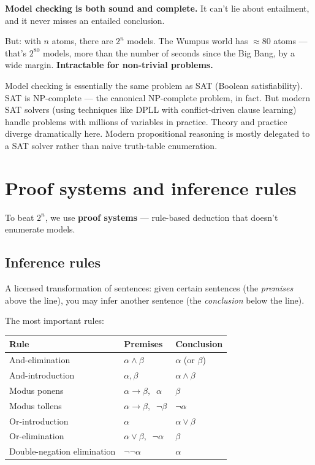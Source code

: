 \documentclass[11pt, a4paper]{article}
\newcommand{\thead}[1]{\textbf{#1}}
\begin{document}
\textbf{Model checking is both sound and complete.} It can't lie about entailment, and it never misses an entailed conclusion.

But: with $n$ atoms, there are $2^n$ models. The Wumpus world has $\approx 80$ atoms — that's $2^{80}$ models, more than the number of seconds since the Big Bang, by a wide margin. \textbf{Intractable for non-trivial problems.}

\begin{notebox}
Model checking is essentially the same problem as SAT (Boolean satisfiability). SAT is NP-complete — the canonical NP-complete problem, in fact. But modern SAT solvers (using techniques like DPLL with conflict-driven clause learning) handle problems with millions of variables in practice. Theory and practice diverge dramatically here. Modern propositional reasoning is mostly delegated to a SAT solver rather than naive truth-table enumeration.
\end{notebox}

\section{Proof systems and inference rules}

To beat $2^n$, we use \textbf{proof systems} — rule-based deduction that doesn't enumerate models.

\subsection{Inference rules}

\begin{defbox}
A licensed transformation of sentences: given certain sentences (the \emph{premises} above the line), you may infer another sentence (the \emph{conclusion} below the line).
\end{defbox}

The most important rules:

\begin{center}
\renewcommand{\arraystretch}{1.4}
\begin{tabular}{@{}lll@{}}
\toprule
\thead{Rule} & \thead{Premises} & \thead{Conclusion} \\
\midrule
And-elimination & $\alpha \land \beta$                 & $\alpha$ (or $\beta$) \\
And-introduction & $\alpha, \beta$                     & $\alpha \land \beta$ \\
Modus ponens    & $\alpha \rightarrow \beta, \;\; \alpha$ & $\beta$ \\
Modus tollens   & $\alpha \rightarrow \beta, \;\; \neg\beta$ & $\neg\alpha$ \\
Or-introduction & $\alpha$                            & $\alpha \lor \beta$ \\
Or-elimination  & $\alpha \lor \beta, \;\; \neg\alpha$ & $\beta$ \\
Double-negation elimination & $\neg \neg \alpha$       & $\alpha$ \\
\bottomrule
\end{tabular}
\end{center}
\end{document}
